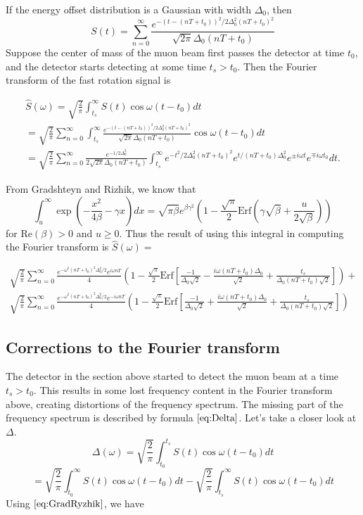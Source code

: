 If the energy offset distribution is a Gaussian with width $\Delta_0$, then \[S(t)=\sum^{\infty}_{n=0}\frac{e^{-(t-(nT+t_0))^2/2\Delta^2_0(nT+t_0)^2}}{\sqrt{2\pi}\Delta_0(nT+t_0)}\] Suppose the center of mass of the muon beam first passes the detector at time $t_0$, and the detector starts detecting at some time $t_s>t_0$. Then the Fourier transform of the fast rotation signal is

\begin{gather}
\hat{S}(\omega)=\sqrt{\frac{2}{\pi}}\int^{\infty}_{t_s}S(t)\cos\omega(t-t_0) dt \nonumber \\
=\sqrt{\frac{2}{\pi}}\sum^{\infty}_{n=0}\int^{\infty}_{t_s}\frac{e^{-(t-(nT+t_0))^2/2\Delta^2_0(nT+t_0)^2}}{\sqrt{2\pi}\Delta_0(nT+t_0)}\cos\omega(t-t_0)dt \nonumber \\ 
=\sqrt{\frac{2}{\pi}}\sum^{\infty}_{n=0}\frac{e^{-1/2\Delta^2_0}}{2\sqrt{2\pi}\Delta_0(nT+t_0)}\int^{\infty}_{t_s}e^{-t^2/2\Delta^2_0(nT+t_0)^2}e^{t/(nT+t_0)\Delta^2_0}e^{\pm i\omega t}e^{\mp i\omega t_0}dt.
\end{gather}

From Gradshteyn and Rizhik, we know that 
\begin{equation}
\int^{\infty}_u\exp\left(-\frac{x^2}{4\beta}-\gamma x\right)dx=\sqrt{\pi\beta}e^{\beta\gamma^2}\left(1-\frac{\sqrt{\pi}}{2}\text{Erf}\left(\gamma\sqrt{\beta}+\frac{u}{2\sqrt{\beta}}\right)\right)
\label{eq:GradRyzhik}
\end{equation}
for $\text{Re}(\beta)>0$ and $u\geq0$. Thus the result of using this integral in computing the Fourier transform is $\hat{S}(\omega)=$ 

\begin{gather}
\sqrt{\frac{2}{\pi}}\sum^{\infty}_{n=0}\frac{e^{-\omega^2(nT+t_0)^2\Delta^2_0/2}e^{i\omega nT}}{4}\left(1-\frac{\sqrt{\pi}}{2}\text{Erf}\left[\frac{-1}{\Delta_0\sqrt{2}}-\frac{i\omega (nT+t_0)\Delta_0}{\sqrt{2}}+\frac{t_s}{\Delta_0(nT+t_0)\sqrt{2}}\right]\right)+ \nonumber \\
\sqrt{\frac{2}{\pi}}\sum^{\infty}_{n=0}\frac{e^{-\omega^2(nT+t_0)^2\Delta^2_0/2}e^{-i\omega nT}}{4}\left(1-\frac{\sqrt{\pi}}{2}\text{Erf}\left[\frac{-1}{\Delta_0\sqrt{2}}+\frac{i\omega (nT+t_0)\Delta_0}{\sqrt{2}}+\frac{t_s}{\Delta_0(nT+t_0)\sqrt{2}}\right]\right)
\end{gather}

\subsection{Corrections to the Fourier transform} The detector in the section above started to detect the muon beam at a time $t_s>t_0$. This results in some lost frequency content in the Fourier transform above, creating distortions of the frequency spectrum. The missing part of the frequency spectrum is described by formula$~\eqref{eq:Delta}$. Let's take a closer look at $\Delta$. \[\Delta(\omega)=\sqrt{\frac{2}{\pi}}\int^{t_s}_{t_0}S(t)\cos\omega(t-t_0)dt\]\[=\sqrt{\frac{2}{\pi}}\int^{\infty}_{t_0}S(t)\cos\omega(t-t_0)dt-\sqrt{\frac{2}{\pi}}\int^{\infty}_{t_s}S(t)\cos\omega(t-t_0)dt\] Using$~\eqref{eq:GradRyzhik}$, we have 

